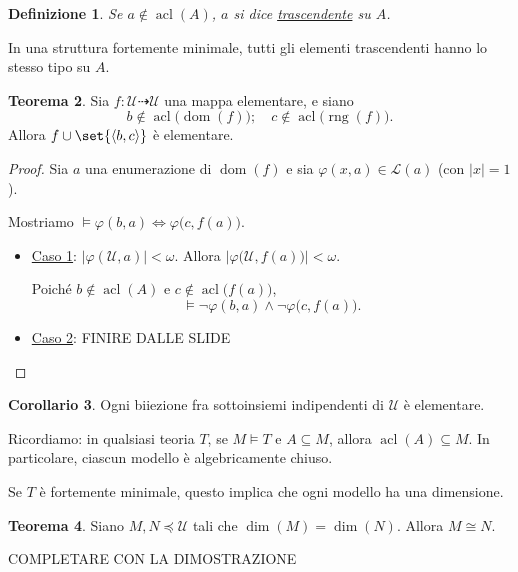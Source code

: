 \documentclass[10pt]{article}
\newcommand{\card}[1]{\left\vert #1 \right\vert}
\newcommand{\1}{\mathds{1}}
\newcommand{\partialto}{\dashrightarrow}
\theoremstyle{definition}%
\newtheorem{thm}{Teorema}[section]
\newtheorem{cor}[thm]{Corollario}
\theoremstyle{plain}
\newtheorem{definizione}[thm]{Definizione}
\theoremstyle{remark}
\begin{document}
\begin{definizione}
Se \(a\notin\operatorname{acl}(A)\), \(a\) si dice \uline{trascendente} su \(A\).
\end{definizione}
In una struttura fortemente minimale, tutti gli elementi trascendenti hanno lo stesso tipo su \(A\).
\begin{thm}
Sia \(f:\mathcal{U}\partialto\mathcal{U}\) una mappa elementare, e siano
\begin{equation*}
b\notin\operatorname{acl}\big(\operatorname{dom}(f)\big);\quad c\notin \operatorname{acl}\big(\operatorname{rng}(f)\big).
\end{equation*}
Allora \(f\cup\set{\langle b,c\rangle}\) è elementare.
\end{thm}
\begin{proof}
Sia \(a\) una enumerazione di \(\operatorname{dom}(f)\) e sia \(\varphi(x,a) \in \mathcal{L}(a)\) (con \(\card{x}=1\)).

Mostriamo \(\vDash \varphi(b,a)\iff\varphi\big(c,f(a)\big)\).
\begin{itemize}
\item \uline{Caso 1}: \(\card{\varphi(\mathcal{U},a)}<\omega\). Allora \(\card{\varphi\big(\mathcal{U},f(a)\big)}<\omega\).

Poiché \(b\notin\operatorname{acl}(A)\) e \(c\notin\operatorname{acl}\big(f(a)\big)\),
\begin{equation*}
  \vDash\lnot\varphi(b,a) \land \lnot\varphi\big(c,f(a)\big).
\end{equation*}
\item \uline{Caso 2}: FINIRE DALLE SLIDE\qedhere
\end{itemize}
\end{proof}
\begin{cor}
Ogni biiezione fra sottoinsiemi indipendenti di \(\mathcal{U}\) è elementare.
\end{cor}

Ricordiamo: in qualsiasi teoria \(T\), se \(M\vDash T\) e \(A \subseteq M\), allora \(\operatorname{acl}(A) \subseteq M\). In particolare, ciascun modello è algebricamente chiuso.

Se \(T\) è fortemente minimale, questo implica che ogni modello ha una dimensione.

\begin{thm}
Siano \(M, N \preceq \mathcal{U}\) tali che \(\dim(M)=\dim(N)\). Allora \(M\cong N\).
\end{thm}

COMPLETARE CON LA DIMOSTRAZIONE
\end{document}
